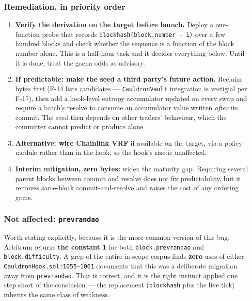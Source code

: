 \documentclass[11pt,a4paper]{article}
\newcommand{\code}[1]{\texttt{\small #1}}
\newcommand{\fileref}[1]{\texttt{\scriptsize #1}}
\begin{document}
\subsubsection*{Remediation, in priority order}

\begin{enumerate}
\item \textbf{Verify the derivation on the target before launch.} Deploy a
one-function probe that records \code{blockhash(block.number - 1)} over a few
hundred blocks and check whether the sequence is a function of the block number
alone. This is a half-hour task and it decides everything below. Until it is
done, treat the gacha odds as advisory.
\item \textbf{If predictable: make the seed a third party's future action.}
Reclaim bytes first (F-14 lists candidates --- \code{CauldronVault} integration is
vestigial per F-17), then add a hook-level entropy accumulator updated on every
swap and require a batch's resolve to consume an accumulator value written
\emph{after} its commit. The seed then depends on other traders' behaviour, which
the committer cannot predict or produce alone.
\item \textbf{Alternative: wire Chainlink VRF} if available on the target, via a
policy module rather than in the hook, so the hook's size is unaffected.
\item \textbf{Interim mitigation, zero bytes:} widen the maturity gap. Requiring
several parent blocks between commit and resolve does not fix predictability, but
it removes same-block commit-and-resolve and raises the cost of any ordering game.
\end{enumerate}

\subsubsection*{Not affected: \texorpdfstring{\code{prevrandao}}{prevrandao}}

Worth stating explicitly, because it is the more common version of this bug.
Arbitrum returns \textbf{the constant 1} for both \code{block.prevrandao} and
\code{block.difficulty}. A grep of the entire in-scope corpus finds \textbf{zero}
uses of either. \fileref{CauldronHook.sol:1055--1061} documents that this was a
deliberate migration away from \code{prevrandao}. That is correct, and it is the
right instinct applied one step short of the conclusion --- the replacement
(\code{blockhash} plus the live tick) inherits the same class of weakness.
\end{document}
